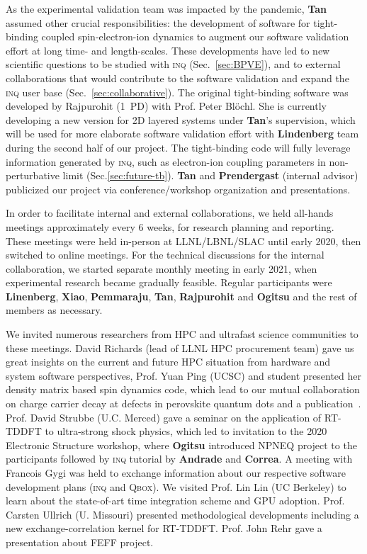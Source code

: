 As the experimental validation team was impacted by the pandemic, {\bf Tan} assumed other crucial responsibilities: the development of software for tight-binding coupled spin-electron-ion dynamics to augment our software validation effort at long time- and length-scales. 
These developments have led to new scientific questions to be studied with \textsc{inq} (Sec.~\ref{sec:BPVE}), and to external collaborations that would contribute to the software validation and expand the \textsc{inq} user base (Sec.~\ref{sec:collaborative}). 
The original tight-binding software was developed by  Rajpurohit (1~PD) with Prof. Peter Bl\"{o}chl. 
She is currently developing a new version for 2D layered systems under {\bf Tan}'s supervision, which will be used for more elaborate software validation effort with {\bf Lindenberg} team during the second half of our project.
The tight-binding code will fully leverage information generated by \textsc{inq}, such as electron-ion coupling parameters in non-perturbative limit (Sec.\ref{sec:future-tb}). 
{\bf Tan} and {\bf Prendergast} (internal advisor) publicized our project via conference/workshop organization and presentations. 

In order to facilitate internal and external collaborations, we held all-hands meetings approximately every 6 weeks, for research planning and reporting.
These meetings were held in-person at LLNL/LBNL/SLAC until early 2020, then switched to online meetings.
For the technical discussions for the internal collaboration, we started separate monthly meeting in early 2021, when experimental research became gradually feasible. 
Regular participants were {\bf Linenberg}, {\bf Xiao}, {\bf Pemmaraju}, {\bf Tan}, {\bf Rajpurohit} and {\bf Ogitsu} and the rest of members as necessary.

We invited numerous researchers from HPC and ultrafast science communities to these meetings. 
David Richards (lead of LLNL HPC procurement team) gave us great insights on the current and future HPC situation from hardware and system software perspectives, 
Prof. Yuan Ping (UCSC) and student presented her density matrix based spin dynamics code, which lead to our mutual collaboration on charge carrier decay at defects in perovskite quantum dots and a publication~\cite{Smart2021}. 
Prof. David Strubbe (U.C. Merced) gave a seminar on the application of RT-TDDFT to ultra-strong shock physics, which led to invitation to the 2020 Electronic Structure workshop, where {\bf Ogitsu} introduced NPNEQ project to the participants followed by \textsc{inq} tutorial by {\bf Andrade} and {\bf Correa}. 
A meeting with Francois Gygi was held to exchange information about our respective software development plans (\textsc{inq} and \textsc{Qbox}). 
We visited Prof. Lin Lin (UC Berkeley) to learn about the state-of-art time integration scheme and GPU adoption. 
Prof. Carsten Ullrich (U. Missouri) presented methodological developments including a new exchange-correlation kernel for RT-TDDFT. 
Prof. John Rehr gave a presentation about FEFF project.

